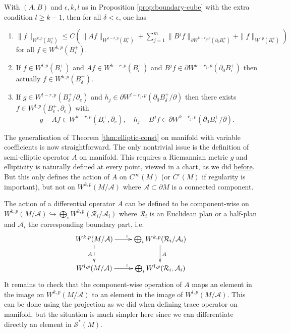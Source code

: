 \begin{lemma}
\label{lem:ell-loc-bndry}
With \((A,B)\) and \(\epsilon, k,l\) as in Proposition \ref{prop:boundary-cube} with the
extra condition \(l\geq k-1\), then for all
\(\delta < \epsilon\), one has
\begin{enumerate}
\item \(\|f\|_{W^{k,p}(B^+_\delta)}\leq C \left( \|Af\|_{W^{k-r,p}(B^+_\epsilon)} +
   \sum_{j=1}^m \|B^j f\|_{\partial W^{k-r_j,p}(\partial_0 B^+_\epsilon)}
   +\|f\|_{W^{l,p}(B^+_\epsilon)} \right)\) for all \(f\in W^{k,p}(B^+_\epsilon)\).
\item If \(f\in W^{l,p}(B^+_\epsilon)\) and \(Af\in W^{k-r,p}(B^+_\epsilon)\) and \(B^j
   f\in \partial W^{k-r_j,p}(\partial_0 B^+_\epsilon)\) then actually \(f\in W^{k,p}(B^+_\delta)\).
\item If \(g\in W^{l-r,p}(B^+_\delta/ \partial_e )\) and \(h_j\in \partial
   W^{l-r_j,p}(\partial_0 B^+_\delta/ \partial)\) then there exists \(f\in
   W^{l,p}(B^+_\epsilon, \partial_e)\) with
\[
    g-Af \in W^{k-r,p}(B^+_\epsilon, \partial_e),\quad h_j-B^j f \in \partial
   W^{k-r_j,p}(\partial_0 B^+_\epsilon/ \partial).
   \]
\end{enumerate}
\end{lemma}


The generalisation of Theorem \ref{thm:elliptic-const} on manifold with variable
coefficients is now straightforward. The only nontrivial issue is the definition of
semi-elliptic operator \(A\) on manifold. This requires a Riemannian metric \(g\) and
ellipticity is naturally defined at every point, viewed in a chart, as we did
\href{./interpolation-sobolev.org}{before}. But this only defines the action of \(A\) on \(C^\infty(M)\) (or \(C^r(M)\)
if regularity is important), but not on \(W^{k,p}(M/ \mathcal{A})\) where \(\mathcal{A}\subset \partial M\) is a connected component.

The action of a differential operator \(A\) can be defined to be component-wise on \(W^{k,p}(M/ \mathcal{A}) \hookrightarrow \bigoplus_i
W^{k,p}(\mathcal{R}_i/\mathcal{A}_i)\) where \(\mathcal{R}_i\) is an Euclidean plan or a half-plan and \(\mathcal{A}_i\) the corresponding boundary part,
i.e.
\[
 \xymatrix{
W^{k,p}(M/\mathcal{A}) \ar@{->}[r]^{\iota} \ar@{-->}[d]_{{A}} & \bigoplus_i W^{k,p}(\mathcal{R}_i/\mathcal{A}_i) \ar@{->}[d]^{{A}} \\
W^{l,p}(M/\mathcal{A}) \ar@{->}[r]^{\iota} & \bigoplus_iW^{l,p}(\mathcal{R}_i, \mathcal{A}_i)
}
\]
It remains to check that the component-wise operation of \({A}\) maps an element
in the image
on \(W^{k,p}(M/\mathcal{A})\) to an element in the image of \(W^{l,p}(M/\mathcal{A})\). This can be done using the projection as we did when defining trace operator on
manifold, but the situation is much simpler here since we can differentiate directly an element
in \(\mathcal{S}^*(M)\).



